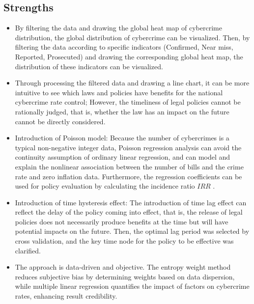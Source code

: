 
\subsection{Strengths}\label{subsec:strengths} %
    \begin{itemize}
        \item By filtering the data and drawing the global heat map of cybercrime distribution,
            the global distribution of cybercrime can be visualized.
            Then, by filtering the data according to specific indicators
            (Confirmed, Near miss, Reported, Prosecuted)
            and drawing the corresponding global heat map,
            the distribution of these indicators can be visualized.
        \item Through processing the filtered data and drawing a line chart,
            it can be more intuitive to see which laws and policies have benefits for the national cybercrime rate control;
            However, the timeliness of legal policies cannot be rationally judged, that is,
            whether the law has an impact on the future cannot be directly considered.
        \item Introduction of Poisson model: Because the number of cybercrimes is a typical non-negative integer data,
            Poisson regression analysis can avoid the continuity assumption of ordinary linear regression,
            and can model and explain the nonlinear association between the number of bills and the crime rate and zero inflation data.
            Furthermore, the regression coefficients can be used for policy evaluation by calculating the incidence ratio $IRR$ .
        \item Introduction of time hysteresis effect:
            The introduction of time lag effect can reflect the delay of the policy coming into effect, that is,
            the release of legal policies does not necessarily produce benefits at the time but will have potential impacts on the future.
            Then, the optimal lag period was selected by cross validation,
            and the key time node for the policy to be effective was clarified.
        \item The approach is data-driven and objective.
            The entropy weight method reduces subjective bias by determining weights based on data dispersion,
            while multiple linear regression quantifies the impact of factors on cybercrime rates, enhancing result credibility.

\end{itemize}
